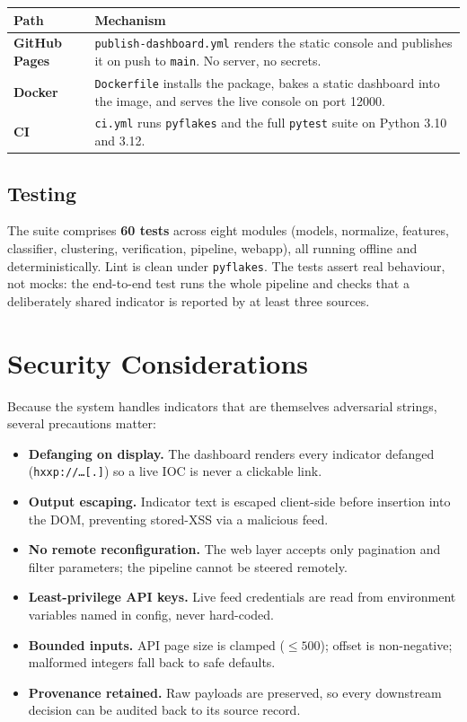 \documentclass[11pt,a4paper]{article}
\newcommand{\code}[1]{\texttt{\small #1}}
\begin{document}
\begin{center}
\begin{tabularx}{\linewidth}{@{}>{\bfseries}p{3.4cm}X@{}}
\toprule
\rowcolor{paper}\textbf{Path} & \textbf{Mechanism} \\
\midrule
GitHub Pages & \code{publish-dashboard.yml} renders the static console and publishes it on push to \code{main}. No server, no secrets. \\
Docker & \code{Dockerfile} installs the package, bakes a static dashboard into the image, and serves the live console on port 12000. \\
CI & \code{ci.yml} runs \code{pyflakes} and the full \code{pytest} suite on Python 3.10 and 3.12. \\
\bottomrule
\end{tabularx}
\end{center}

\subsection{Testing}
The suite comprises \textbf{60 tests} across eight modules (models, normalize,
features, classifier, clustering, verification, pipeline, webapp), all running
offline and deterministically. Lint is clean under \code{pyflakes}. The tests
assert real behaviour, not mocks: the end-to-end test runs the whole pipeline
and checks that a deliberately shared indicator is reported by at least three
sources.

\section{Security Considerations}

Because the system handles indicators that are themselves adversarial strings,
several precautions matter:

\begin{itemize}[leftmargin=1.4em,itemsep=3pt]
  \item \textbf{Defanging on display.} The dashboard renders every indicator
    defanged (\code{hxxp://\dots[.]}) so a live IOC is never a clickable link.
  \item \textbf{Output escaping.} Indicator text is escaped client-side before
    insertion into the DOM, preventing stored-XSS via a malicious feed.
  \item \textbf{No remote reconfiguration.} The web layer accepts only
    pagination and filter parameters; the pipeline cannot be steered remotely.
  \item \textbf{Least-privilege API keys.} Live feed credentials are read from
    environment variables named in config, never hard-coded.
  \item \textbf{Bounded inputs.} API page size is clamped ($\le 500$); offset is
    non-negative; malformed integers fall back to safe defaults.
  \item \textbf{Provenance retained.} Raw payloads are preserved, so every
    downstream decision can be audited back to its source record.
\end{itemize}
\end{document}
